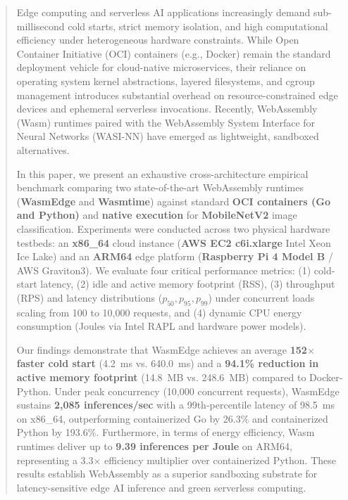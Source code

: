 \documentclass[conference]{IEEEtran}
\begin{document}
\begin{abstract}
Edge computing and serverless AI applications increasingly demand sub-millisecond cold starts, strict memory isolation, and high computational efficiency under heterogeneous hardware constraints. While Open Container Initiative (OCI) containers (e.g., Docker) remain the standard deployment vehicle for cloud-native microservices, their reliance on operating system kernel abstractions, layered filesystems, and cgroup management introduces substantial overhead on resource-constrained edge devices and ephemeral serverless invocations. Recently, WebAssembly (Wasm) runtimes paired with the WebAssembly System Interface for Neural Networks (WASI-NN) have emerged as lightweight, sandboxed alternatives. 

In this paper, we present an exhaustive cross-architecture empirical benchmark comparing two state-of-the-art WebAssembly runtimes (\textbf{WasmEdge} and \textbf{Wasmtime}) against standard \textbf{OCI containers (Go and Python)} and \textbf{native execution} for \textbf{MobileNetV2} image classification. Experiments were conducted across two physical hardware testbeds: an \textbf{x86\_64} cloud instance (\textbf{AWS EC2 c6i.xlarge} Intel Xeon Ice Lake) and an \textbf{ARM64} edge platform (\textbf{Raspberry Pi 4 Model B} / AWS Graviton3). We evaluate four critical performance metrics: (1) cold-start latency, (2) idle and active memory footprint (RSS), (3) throughput (RPS) and latency distributions ($p_{50}, p_{95}, p_{99}$) under concurrent loads scaling from 100 to 10,000 requests, and (4) dynamic CPU energy consumption (Joules via Intel RAPL and hardware power models). 

Our findings demonstrate that WasmEdge achieves an average \textbf{152$\times$ faster cold start} (4.2~ms vs. 640.0~ms) and a \textbf{94.1\% reduction in active memory footprint} (14.8~MB vs. 248.6~MB) compared to Docker-Python. Under peak concurrency (10,000 concurrent requests), WasmEdge sustains \textbf{2,085 inferences/sec} with a 99th-percentile latency of 98.5~ms on x86\_64, outperforming containerized Go by 26.3\% and containerized Python by 193.6\%. Furthermore, in terms of energy efficiency, Wasm runtimes deliver up to \textbf{9.39 inferences per Joule} on ARM64, representing a 3.3$\times$ efficiency multiplier over containerized Python. These results establish WebAssembly as a superior sandboxing substrate for latency-sensitive edge AI inference and green serverless computing.
\end{abstract}
\end{document}
